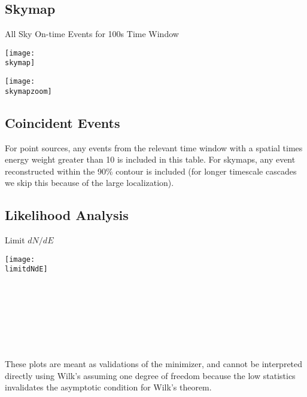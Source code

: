 \documentclass[titlepage]{article}
\begin{document}
\pagebreak
\subsection{Skymap}

{
  \centering
  {\Large All Sky On-time Events for 100s Time Window}

  \texttt{[image: \\skymap]}

  \texttt{[image: \\skymapzoom]}

}
\pagebreak


\subsection{Coincident Events}
For point sources, any events from the relevant time window with a spatial times energy weight greater than 10 is included in this table. For skymaps, any event reconstructed within the 90\% contour is included (for longer timescale cascades we skip this because of the large localization).
\event

\subsection{Likelihood Analysis}
\results
\pagebreak

\backgroundpdfplot

\survivialfunctionplot

\pagebreak
{
  \centering

  {\Large Limit $dN/dE$}

  \texttt{[image: \\limitdNdE]}
  \\
  \\

  \tsd

  \\
  \\
  \upperlim

  \\
  \\
  \nsscan

  These plots are meant as validations of the minimizer, and cannot be interpreted directly using Wilk's assuming one degree of freedom because the low statistics invalidates the asymptotic condition for Wilk's theorem.
}

\vfill
\end{document}
